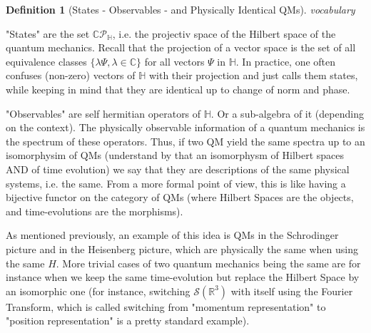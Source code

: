 \documentclass[a4paper,11pt]{article}
\numberwithin{equation}{section}
\theoremstyle{definition}
\newtheorem{definition}{Definition}
\begin{document}
\begin{definition}[States - Observables - and Physically Identical QMs] \emph{vocabulary}


"States" are the set $\mathbb{C}\mathcal{P}_\mathbb{H}$, i.e. the projectiv space of the Hilbert space of the quantum mechanics. Recall that the projection of a vector space is the set of all equivalence classes $\{\lambda \Psi, \lambda\in\mathbb{C}\}$ for all vectors $\Psi$ in $\mathbb{H}$. In practice, one often confuses (non-zero) vectors of $\mathbb{H}$ with their projection and just calls them states, while keeping in mind that they are identical up to change of norm and phase.

"Observables" are self hermitian operators of $\mathbb{H}$. Or a sub-algebra of it (depending on the context). The physically observable information of a quantum mechanics is the spectrum of these operators. Thus, if two QM yield the same spectra up to an isomorphysim of QMs (understand by that an isomorphysm of Hilbert spaces AND of time evolution) we say that they are descriptions of the same physical systems, i.e. the same. From a more formal point of view, this is like having a bijective functor on the category of QMs (where Hilbert Spaces are the objects, and time-evolutions are the morphisms).

As mentioned previously, an example of this idea is QMs in the Schrodinger picture and in the Heisenberg picture, which are physically the same when using the same $H$. More trivial cases of two quantum mechanics being the same are for instance when we keep the same time-evolution but replace the Hilbert Space by an isomorphic one (for instance, switching $\mathcal{S}(\mathbb{R}^3)$ with itself using the Fourier Transform, which is called switching from "momentum representation" to "position representation" is a pretty standard example).    
\end{definition}
\end{document}
